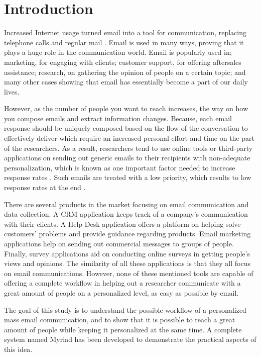 \chapter{Introduction}
\label{chp:Intro}
Increased Internet usage turned email into a tool for communication, replacing telephone calls and regular mail \citep{Norman2000,Madden2003}. Email is used in many ways, proving that it plays a huge role in the communication world. Email is popularly used in; marketing, for engaging with clients; customer support, for offering aftersales assistance; research, on gathering the opinion of people on a certain topic; and many other cases showing that email has essentially become a part of our daily lives.
\vspace{1cm}

However, as the number of people you want to reach increases, the way on how you compose emails and extract information changes. Because, each email response should be uniquely composed based on the flow of the conversation to effectively deliver which require an increased personal effort and time on the part of the researchers. As a result, researchers tend to use online tools or third-party applications on sending out generic emails to their recipients with non-adequate personalization, which is known as one important factor needed to increase response rates \citep{Dillman1991,Schaefer1998}. Such emails are treated with a low priority, which results to low response rates at the end \citep[page 272]{DillmanDonA.SmythJoleneD.Christian2009}.
\vspace{1cm}

There are several products in the market focusing on email communication and data collection. A \ac{CRM} application keeps track of a company's communication with their clients. A Help Desk application offers a platform on helping solve customers' problems and provide guidance regarding products. Email marketing applications help on sending out commercial messages to groups of people. Finally, survey applications aid on conducting online surveys in getting people's views and opinions. The similarity of all these applications is that they all focus on email communications. However, none of these mentioned tools are capable of offering a complete workflow in helping out a researcher communicate with a great amount of people on a personalized level, as easy as possible by email.
\vspace{1cm}

The goal of this study is to understand the possible workflow of a personalized mass email communication, and to show that it is possible to reach a great amount of people while keeping it personalized at the same time. A complete system named Myriad has been developed to demonstrate the practical aspects of this idea.

